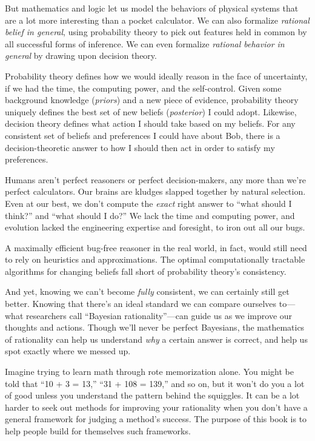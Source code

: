 {
 But mathematics and logic let us model the behaviors of physical
systems that are a lot more interesting than a pocket calculator. We
can also formalize \textit{rational belief in general}, using
probability theory to pick out features held in common by all
successful forms of inference. We can even formalize \textit{rational
behavior in general} by drawing upon decision theory.}

{
 Probability theory defines how we would ideally reason in the face
of uncertainty, if we had the time, the computing power, and the
self-control. Given some background knowledge (\textit{priors}) and a
new piece of evidence, probability theory uniquely defines the best set
of new beliefs (\textit{posterior}) I could adopt. Likewise, decision
theory defines what action I should take based on my beliefs. For any
consistent set of beliefs and preferences I could have about Bob, there
is a decision-theoretic answer to how I should then act in order to
satisfy my preferences.}

{
 Humans aren't perfect reasoners or perfect
decision-makers, any more than we're perfect
calculators. Our brains are kludges slapped together by natural
selection. Even at our best, we don't compute the
\textit{exact} right answer to ``what should I
think?'' and ``what should I
do?'' We lack the time and computing power, and
evolution lacked the engineering expertise and foresight, to iron out
all our bugs.}

{
 A maximally efficient bug-free reasoner in the real world, in
fact, would still need to rely on heuristics and approximations. The
optimal computationally tractable algorithms for changing beliefs fall
short of probability theory's consistency.}

{
 And yet, knowing we can't become \textit{fully}
consistent, we can certainly still get better. Knowing that
there's an ideal standard we can compare ourselves
to---what researchers call ``Bayesian
rationality''---can guide us as we improve our
thoughts and actions. Though we'll never be perfect
Bayesians, the mathematics of rationality can help us understand
\textit{why} a certain answer is correct, and help us spot exactly
where we messed up.}

{
 Imagine trying to learn math through rote memorization alone. You
might be told that ``10 + 3 = 13,''
``31 + 108 = 139,'' and so on, but
it won't do you a lot of good unless you understand the
pattern behind the squiggles. It can be a lot harder to seek out
methods for improving your rationality when you don't
have a general framework for judging a method's
success. The purpose of this book is to help people build for
themselves such frameworks.}


